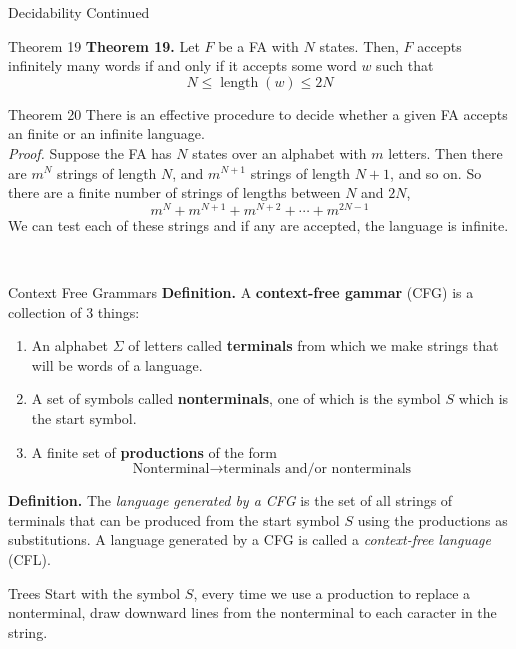 \documentclass{article}
\DeclareMathOperator{\length}{length}
\begin{document}
\begin{multicols*}{3}
\begin{blackbox}{Decidability Continued}
    \begin{redbox}{Theorem 19}
        \textbf{Theorem 19.} Let $F$ be a FA with $N$ states. Then, $F$ accepts infinitely many words if and only if it accepts some word $w$ such that \\[-2ex]
        \[N \leq \length(w) \leq 2N\]
    \end{redbox}
    \begin{pinkbox}{Theorem 20}
        There is an effective procedure to decide whether a given FA accepts an finite or an infinite language.\\[1ex]
        \textit{Proof.} Suppose the FA has $N$ states over an alphabet with $m$ letters. Then there are $m^{N}$ strings of length $N$, and $m^{N+1}$ strings of length $N+1$, and so on. So there are a finite number of strings of lengths between $N$ and $2N$, \\[-1ex]
        \[m^N + m^{N+1} + m^{N+2} + \cdots + m^{2N-1}\]
        We can test each of these strings and if any are accepted, the language is infinite.
    \end{pinkbox}\\[-2ex]
\end{blackbox}
\begin{blackbox}{Context Free Grammars}
    \textbf{Definition.} A \textbf{context-free gammar} (CFG) is a collection of 3 things:
    \begin{enumerate}[leftmargin=7pt]
        \item An alphabet $\Sigma$ of letters called \textbf{terminals} from which we make strings that will be words of a language.
        \item A set of symbols called \textbf{nonterminals}, one of which is the symbol $S$ which is the start symbol.
        \item A finite set of \textbf{productions} of the form \\[-4ex]
        \[\text{Nonterminal} \rightarrow \text{terminals and/or nonterminals}\]
    \end{enumerate}
    \vspace{-2ex}
    \textbf{Definition.} The \emph{language generated by a CFG} is the set of all strings of terminals that can be produced from the start symbol $S$ using the productions as substitutions. A language generated by a CFG is called a \emph{context-free language} (CFL).
    \begin{bluebox}{Trees}
        Start with the symbol $S$, every time we use a production to replace a nonterminal, draw downward lines from the nonterminal to each caracter in the string.\\[-6ex]

\end{bluebox}
\end{blackbox}
\end{multicols*}
\end{document}
